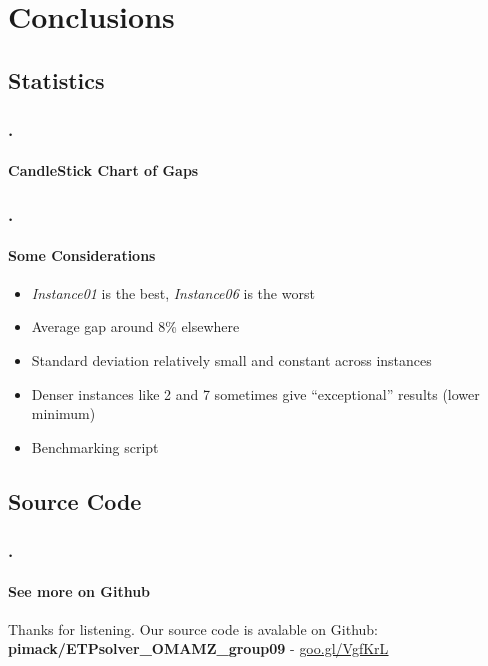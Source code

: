\documentclass{beamer}
\begin{document}
\section{Conclusions}

\subsection{Statistics}

\begin{frame}
\frametitle{\thesection.\thesubsection \ \insertsubsection}
\framesubtitle{CandleStick Chart of Gaps}
\end{frame}

\begin{frame}
\frametitle{\thesection.\thesubsection \ \insertsubsection}
\framesubtitle{Some Considerations}
\begin{itemize}
	\item \textit{Instance01} is the \alert{best}, \textit{Instance06} is the \alert{worst}
	\item Average gap around 8\% elsewhere
	\item Standard deviation relatively small and constant across instances
	\item Denser instances like 2 and 7 sometimes give ``exceptional'' results (lower minimum)
	\item Benchmarking script
\end{itemize}
\end{frame}

\subsection{Source Code}

\begin{frame}
\frametitle{\thesection.\thesubsection \ \insertsubsection}
\framesubtitle{See more on Github}
Thanks for listening.
\vfill
Our source code is avalable on Github:
\textbf{pimack/ETPsolver\_OMAMZ\_group09} -  \href{https://goo.gl/VgfKrL}{\underline{goo.gl/VgfKrL}}
\end{frame}
\end{document}
